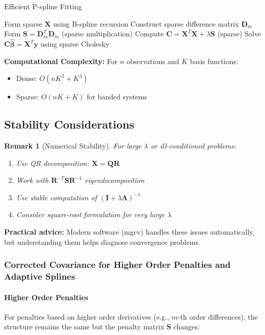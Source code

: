 \documentclass[12pt]{article}
\newtheorem{remark}{Remark}
\begin{document}
\begin{algorithm}
\caption{Efficient P-spline Fitting}
\begin{algorithmic}[1]
\State Form sparse $\mathbf{X}$ using B-spline recursion
\State Construct sparse difference matrix $\mathbf{D}_m$
\State Form $\mathbf{S} = \mathbf{D}_m^T\mathbf{D}_m$ (sparse multiplication)
\State Compute $\mathbf{C} = \mathbf{X}^T\mathbf{X} + \lambda\mathbf{S}$ (sparse)
\State Solve $\mathbf{C}\hat{\bm{\beta}} = \mathbf{X}^T\mathbf{y}$ using sparse Cholesky
\end{algorithmic}
\end{algorithm}

\textbf{Computational Complexity:} For $n$ observations and $K$ basis functions:
\begin{itemize}
    \item Dense: $O(nK^2 + K^3)$
    \item Sparse: $O(nK + K)$ for banded systems
\end{itemize}

\subsection{Stability Considerations}

\begin{remark}[Numerical Stability]
For large $\lambda$ or ill-conditioned problems:
\begin{enumerate}
    \item Use QR decomposition: $\mathbf{X} = \mathbf{Q}\mathbf{R}$
    \item Work with $\mathbf{R}^{-T}\mathbf{S}\mathbf{R}^{-1}$ eigendecomposition
    \item Use stable computation of $(\mathbf{I} + \lambda\bm{\Lambda})^{-1}$
    \item Consider square-root formulation for very large $\lambda$
\end{enumerate}
\end{remark}

\textbf{Practical advice:} Modern software (mgcv) handles these issues automatically, but understanding them helps diagnose convergence problems.


\subsubsection{Corrected Covariance for Higher Order Penalties and Adaptive Splines}

\paragraph{Higher Order Penalties}
For penalties based on higher order derivatives (e.g., $m$-th order differences), the structure remains the same but the penalty matrix $\mathbf{S}$ changes:
\end{document}
